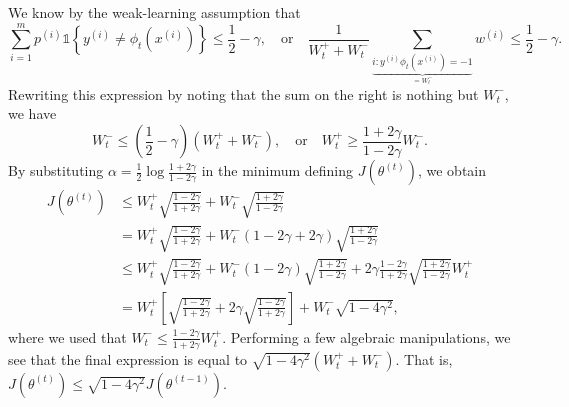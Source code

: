We know by the weak-learning assumption that
\[
    \sum_{i=1}^m p^{(i)} \mathbb{1}\left\{y^{(i)}\ne \phi_t (x^{(i)}) \right\} \le \frac{1}{2}-\gamma, \quad\text{or}\quad \frac{1}{W^+_t + W^-_t} \sum_{\underbrace{i:y^{(i)} \phi_t (x^{(i)} )=-1}_{=W^-_t}} w^{(i)} \le \frac{1}{2} - \gamma.
\]
Rewriting this expression by noting that the sum on the right is nothing but
$W^-_t$, we have
\[
    W^-_t \le \left(\frac{1}{2} - \gamma\right) (W^+_t + W^-_t), \quad\text{or}\quad W^+_t \ge \frac{1 + 2\gamma}{1 - 2\gamma}W^-_t.
\]
By substituting $\alpha = \frac{1}{2} \log\frac{1+2\gamma}{1-2\gamma}$ in the minimum defining $J(\theta^{(t)} )$, we obtain
\begin{align*}
    J(\theta^{(t)} ) &\le W^+_t \sqrt{\frac{1 - 2\gamma}{1 + 2\gamma}} + W^-_t\sqrt{\frac{1 + 2\gamma}{1 - 2\gamma}}\\
        &= W^+_t\sqrt{\frac{1 - 2\gamma}{1 + 2\gamma}} + W^-_t (1 - 2\gamma + 2\gamma)\sqrt{\frac{1 + 2\gamma}{1 - 2\gamma}}\\
        &\le W^+_t\sqrt{\frac{1 - 2\gamma}{1 + 2\gamma}} + W^-_t (1 - 2\gamma)\sqrt{\frac{1 + 2\gamma}{1 - 2\gamma}} + 2\gamma\frac{1 - 2\gamma}{1 + 2\gamma}\sqrt{\frac{1 + 2\gamma}{1 - 2\gamma}} W^+_t\\
        &= W^+_t\left[\sqrt{\frac{1 - 2\gamma}{1 + 2\gamma}} + 2\gamma\sqrt{\frac{1 - 2\gamma}{1 + 2\gamma}}\right] + W^-_t \sqrt{1 - 4\gamma^2},
\end{align*}
where we used that $W^-_t \le \frac{1-2\gamma}{1+2\gamma} W^+_t$. Performing a few algebraic
manipulations, we see that the final expression is equal to $\sqrt{1 - 4\gamma^2} (W^+_t + W^-_t)$. %
That is, $J(\theta^{(t)} ) \le \sqrt{1 - 4\gamma^2} J(\theta^{(t-1)})$.
